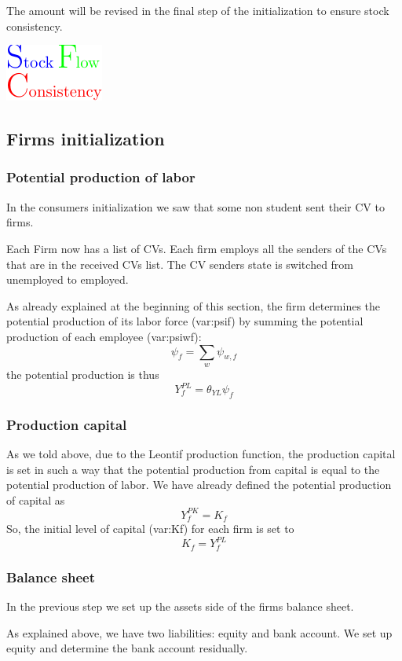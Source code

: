 \documentclass{book}
\begin{document}
The amount will be revised in the final step of the initialization to ensure stock consistency.\begin{marginfigure}
	\hskip1cm\includegraphics[scale=1.0]{sfc_logo-0.pdf}
\end{marginfigure}


\subsection{Firms initialization}
\subsubsection{Potential production of labor}
In the consumers initialization we saw that some non student sent their CV to firms.

Each Firm now has a list of CVs. Each firm employs all the senders of the CVs that are in the received CVs list. The CV senders state is switched from unemployed to employed.

As already explained at the beginning of this section, the firm determines the potential production of its labor force (\gls{var:psif}) by summing the potential production of each employee (\gls{var:psiwf}):
\[
	\psi_f=\sum_{w}\psi_{w,f}
\]
the potential production is thus
\[
	Y^{PL}_f=\theta_{YL}\psi_f
\]

\subsubsection{Production capital}
As we told above, due to the Leontif production function, the production capital is set in such a way that the potential production from capital is equal to the potential production of labor. We have already defined the potential production of capital as
\[Y_f^{PK}=K_f\]
So, the initial level of capital (\gls{var:Kf}) for each firm is set to
\[
K_f=Y^{PL}_f
\]
\subsubsection{Balance sheet}

In the previous step we set up the assets side of the firms balance sheet.

As explained above, we have two liabilities: equity and bank account. We set up equity and determine the bank account residually.
\end{document}
